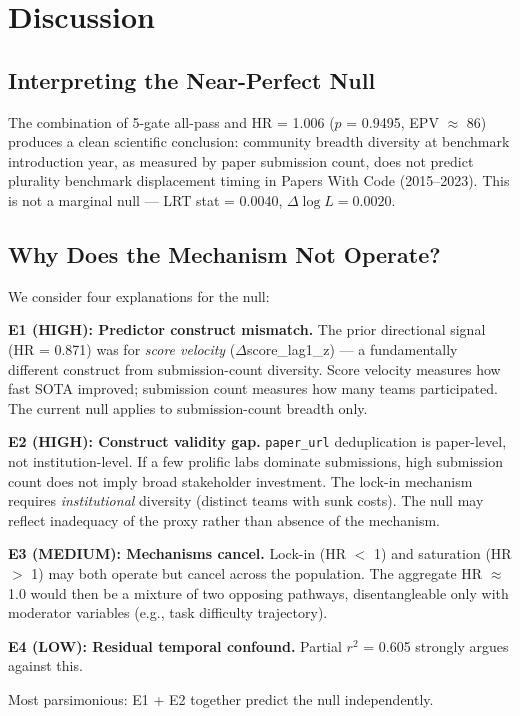 \section{Discussion}

\subsection{Interpreting the Near-Perfect Null}

The combination of 5-gate all-pass and HR = 1.006 ($p$ = 0.9495, EPV $\approx$ 86) produces a clean scientific conclusion: community breadth diversity at benchmark introduction year, as measured by paper submission count, does not predict plurality benchmark displacement timing in Papers With Code (2015--2023). This is not a marginal null --- LRT stat = 0.0040, $\Delta\log L = 0.0020$.

\subsection{Why Does the Mechanism Not Operate?}

We consider four explanations for the null:

\textbf{E1 (HIGH): Predictor construct mismatch.} The prior directional signal (HR = 0.871) was for \emph{score velocity} ($\Delta$score\_lag1\_z) --- a fundamentally different construct from submission-count diversity. Score velocity measures how fast SOTA improved; submission count measures how many teams participated. The current null applies to submission-count breadth only.

\textbf{E2 (HIGH): Construct validity gap.} \texttt{paper\_url} deduplication is paper-level, not institution-level. If a few prolific labs dominate submissions, high submission count does not imply broad stakeholder investment. The lock-in mechanism requires \emph{institutional} diversity (distinct teams with sunk costs). The null may reflect inadequacy of the proxy rather than absence of the mechanism.

\textbf{E3 (MEDIUM): Mechanisms cancel.} Lock-in (HR $<$ 1) and saturation (HR $>$ 1) may both operate but cancel across the population. The aggregate HR $\approx$ 1.0 would then be a mixture of two opposing pathways, disentangleable only with moderator variables (e.g., task difficulty trajectory).

\textbf{E4 (LOW): Residual temporal confound.} Partial $r^{2}$ = 0.605 strongly argues against this.

Most parsimonious: E1 + E2 together predict the null independently.

